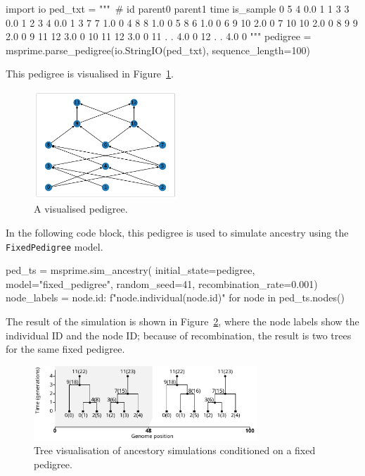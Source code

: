 \documentclass[graybox]{svmult}
\begin{document}
\begin{pythoncode}
import io
ped_txt = """\
# id parent0 parent1 time is_sample
0   5   4   0.0 1
1   3   3   0.0 1
2   3   4   0.0 1
3   7   7   1.0 0
4   8   8   1.0 0
5   8   6   1.0 0
6   9   10  2.0 0
7   10  10  2.0 0
8   9   9   2.0 0
9   11  12  3.0 0
10  11  12  3.0 0
11  .   .   4.0 0
12  .   .   4.0 0
"""
pedigree = msprime.parse_pedigree(io.StringIO(ped_txt), sequence_length=100)
\end{pythoncode}

This pedigree is visualised in Figure~\ref{fig:pedigree}.

\begin{figure}
\begin{center}
\includegraphics[width=0.48\textwidth]{images/pedigree.pdf}
\end{center}
\caption{\label{fig:pedigree} A visualised pedigree.}
\end{figure}

In the following code block, this pedigree is used to simulate ancestry using the \texttt{FixedPedigree} model.

\begin{pythoncode}
ped_ts = msprime.sim_ancestry(
    initial_state=pedigree, model="fixed_pedigree", random_seed=41,
    recombination_rate=0.001)
node_labels = {node.id: f"{node.individual}({node.id})" for node in ped_ts.nodes()}
\end{pythoncode}

The result of the simulation is shown in Figure~\ref{fig:pedigree-simulation}, where the node labels show the individual ID and the node ID;
 because of recombination, the result is two trees for the same fixed pedigree.

\begin{figure}
\begin{center}
\includegraphics[width=0.75\textwidth]{images/pedigree-simulation.pdf}
\end{center}
\caption{\label{fig:pedigree-simulation} Tree visualisation of ancestory simulations conditioned on a fixed pedigree.}
\end{figure}
\end{document}
